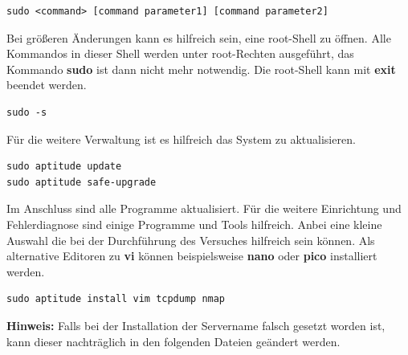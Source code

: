 \begin{lstlisting}
sudo <command> [command parameter1] [command parameter2] 
\end{lstlisting}

Bei größeren Änderungen kann es hilfreich sein, eine root-Shell zu öffnen. Alle
Kommandos in dieser Shell werden unter root-Rechten ausgeführt, das Kommando
\textbf{sudo} ist dann nicht mehr notwendig. Die root-Shell kann mit 
\textbf{exit} beendet werden.

\begin{lstlisting}
sudo -s
\end{lstlisting}

Für die weitere Verwaltung ist es hilfreich das System zu aktualisieren.

\begin{lstlisting}
sudo aptitude update
sudo aptitude safe-upgrade 
\end{lstlisting}

Im Anschluss sind alle Programme aktualisiert. Für die weitere Einrichtung und
Fehlerdiagnose sind einige Programme und Tools hilfreich. Anbei eine kleine
Auswahl die bei der Durchführung des Versuches hilfreich sein können.
Als alternative Editoren zu \textbf{vi} können beispielsweise \textbf{nano}
oder \textbf{pico} installiert werden.

\begin{lstlisting}
sudo aptitude install vim tcpdump nmap
\end{lstlisting}

\textbf{Hinweis:} Falls bei der Installation der Servername falsch gesetzt
worden ist, kann dieser nachträglich in den folgenden Dateien geändert werden.

